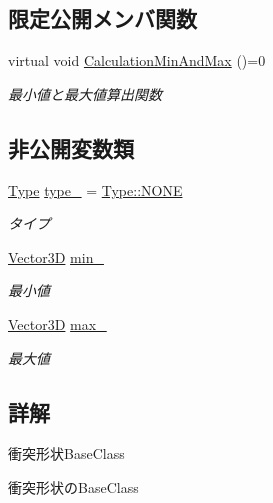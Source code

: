 \subsection*{限定公開メンバ関数}
\begin{DoxyCompactItemize}
\item 
virtual void \mbox{\hyperlink{class_collision_shape_base_ad227c2f83038d7c05bc6b1d510cb4000}{Calculation\+Min\+And\+Max}} ()=0
\begin{DoxyCompactList}\small\item\em 最小値と最大値算出関数 \end{DoxyCompactList}\end{DoxyCompactItemize}
\subsection*{非公開変数類}
\begin{DoxyCompactItemize}
\item 
\mbox{\hyperlink{class_collision_shape_base_a8abcef092855ad0ca191047044b002cb}{Type}} \mbox{\hyperlink{class_collision_shape_base_a46413b1e4d4b3a35075232fa9012addb}{type\+\_\+}} = \mbox{\hyperlink{class_collision_shape_base_a8abcef092855ad0ca191047044b002cbab50339a10e1de285ac99d4c3990b8693}{Type\+::\+N\+O\+NE}}
\begin{DoxyCompactList}\small\item\em タイプ \end{DoxyCompactList}\item 
\mbox{\hyperlink{class_vector3_d}{Vector3D}} \mbox{\hyperlink{class_collision_shape_base_af6b4c8627469bfe135d02b67de688bac}{min\+\_\+}}
\begin{DoxyCompactList}\small\item\em 最小値 \end{DoxyCompactList}\item 
\mbox{\hyperlink{class_vector3_d}{Vector3D}} \mbox{\hyperlink{class_collision_shape_base_a4a9788a4a72f5dd77cd26a281c2d17e4}{max\+\_\+}}
\begin{DoxyCompactList}\small\item\em 最大値 \end{DoxyCompactList}\end{DoxyCompactItemize}


\subsection{詳解}
衝突形状\+Base\+Class 

衝突形状の\+Base\+Class 

